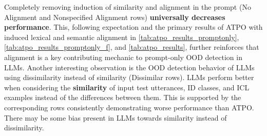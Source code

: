 Completely removing induction of similarity and alignment in the prompt (No Alignment and Nonspecified Alignment rows) \textbf{universally decreases performance}. This, following expectation and the primary results of ATPO with induced lexical and semantic alignment in \ref{tab:atpo_results_promptonly}, \ref{tab:atpo_results_promptonly_f}, and \ref{tab:atpo_results}, further reinforces that alignment is a key contributing mechanic to prompt-only OOD detection in LLMs. %
Another interesting observation is the OOD detection behavior of LLMs using dissimilarity instead of similarity (Dissimilar rows). LLMs perform better when considering the \textbf{similarity} of input test utterances, ID classes, and ICL examples instead of the differences between them. This is supported by the corresponding rows consistently demonstrating worse performance than ATPO. There may be some bias present in LLMs towards similarity instead of dissimilarity.


